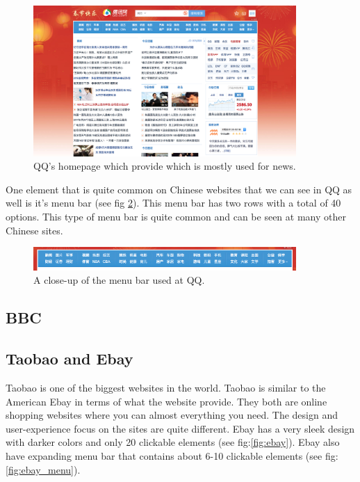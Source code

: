\begin{figure}[h]
\centering
\includegraphics[width=100mm]{Images/QQ.png}
\decoRule
\caption[QQ.com]{QQ's homepage which provide which is mostly used for news.}
\label{fig:QQ.com}
\end{figure}

One element that is quite common on Chinese websites that we can see in QQ as well is it's menu bar (see fig \ref{fig:QQ_menubar}). This menu bar has two rows with a total of 40 options. This type of menu bar is quite common and can be seen at many other Chinese sites.


\begin{figure}[h]
\centering
\includegraphics[width=100mm]{Images/QQ_menubar.png}
\decoRule
\caption[QQ's Menu bar]{A close-up of the menu bar used at QQ.}
\label{fig:QQ_menubar}
\end{figure}

\subsection{BBC}

\subsection{Taobao and Ebay}
Taobao is one of the biggest websites in the world. Taobao is similar to the American Ebay in terms of what the website provide. They both are online shopping websites where you can almost everything you need. The design and user-experience focus on the sites are quite different. Ebay has a very sleek design with darker colors and only 20 clickable elements (see fig:\ref{fig:ebay}). Ebay also have expanding menu bar that contains about 6-10 clickable elements (see fig:\ref{fig:ebay_menu}).

